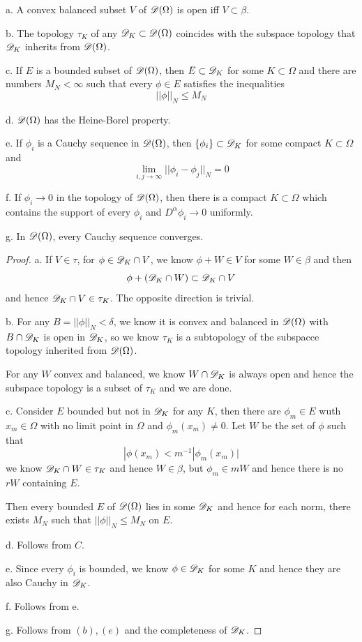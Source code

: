 \begin{theorem}
    a. A convex balanced subset $V$ of $\mathscr{D}(\Omega)$ is open iff $V\subset \beta$.\par
    b. The topology $\tau_K$ of any $\mathscr{D}_K \subset \mathscr{D}(\Omega)$ coincides with the subspace topology that $\mathscr{D}_K$ inherits from $\mathscr{D}(\Omega)$.\par
    c. If $E$ is a bounded subset of $\mathscr{D}(\Omega)$, then $E\subset \mathscr{D}_K$ for some $K\subset \Omega$ and there are numbers $M_N < \infty$ such that every $\phi \in E$ satisfies the inequalities
    \[||\phi||_N \leq M_N\]\par
    d. $\mathscr{D}(\Omega)$ has the Heine-Borel property.\par
    e. If $\phi_i$ is a Cauchy sequence in $\mathscr{D}(\Omega)$, then $\{\phi_i\} \subset \mathscr{D}_K$ for some compact $K\subset \Omega$ and
    \[\lim_{i,j\to\infty} ||\phi_i - \phi_j||_N = 0\]\par
    f. If $\phi_i\to 0$ in the topology of $\mathscr{D}(\Omega)$, then there is a compact $K\subset \Omega$ which contains the support of every $\phi_i$ and $D^{\alpha}\phi_i \to 0$ uniformly.\par
    g. In $\mathscr{D}(\Omega)$, every Cauchy sequence converges.
\end{theorem}
\begin{proof}
    a. If $V\in \tau$, for $\phi \in \mathscr{D}_K \cap V$, we know $\phi+W \in V$ for some $W\in\beta$ and then
    \[\phi + (\mathscr{D}_K\cap W) \subset \mathscr{D}_K\cap V\]
    and hence $\mathscr{D}_K \cap V \in \tau_K$. The opposite direction is trivial.\par
    b. For any $B = ||\phi||_N < \delta$, we know it is convex and balanced in $\mathscr{D}(\Omega)$ with $B\cap \mathscr{D}_K$ is open in $\mathscr{D}_K$, so we know $\tau_K$ is a subtopology of the subspacce topology inherited from $\mathscr{D}(\Omega)$.\par
    For any $W$ convex and balanced, we know $W\cap \mathscr{D}_K$ is always open and hence the subspace topology is a subset of $\tau_K$ and we are done.\par
    c. Consider $E$ bounded but not in $\mathscr{D}_K$ for any $K$, then there are $\phi_m \in E$ wuth $x_m \in \Omega$ with no limit point in $\Omega$ and $\phi_m(x_m) \neq 0$. Let $W$ be the set of $\phi$ such that 
    \[|\phi(x_m) < m^{-1}|\phi_m(x_m)|\]
    we know $\mathscr{D}_K \cap W \in \tau_K$ and hence $W\in \beta$, but $\phi_m \in mW$ and hence there is no $rW$ containing $E$.\par
    Then every bounded $E$ of $\mathscr{D}(\Omega)$ lies in some $\mathscr{D}_K$ and hence for each norm, there exists $M_N$ such that $||\phi||_N \leq M_N$ on $E$.\par
    d. Follows from $C$.\par
    e. Since every $\phi_i$ is bounded, we know $\phi\in \mathscr{D}_K$ for some $K$ and hence they are also Cauchy in $\mathscr{D}_K$.\par
    f. Follows from e.\par
    g. Follows from $(b),(e)$ and the completeness of $\mathscr{D}_K$.
\end{proof}

